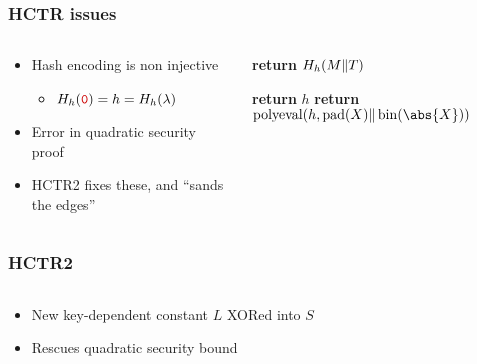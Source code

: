 \documentclass[aspectratio=169]{beamer}
\newenvironment*{figslide}{
    \begin{columns}
        \begin{column}{.4\textwidth}

}{
\end{column}
\begin{column}{.6\textwidth}
    \begin{figure}
        
    \end{figure}
\end{column}
\end{columns}
}
\begin{document}
\begin{frame}

\frametitle{HCTR issues}
\begin{columns}
    \begin{column}{.4\textwidth}
        \begin{itemize}
            \item Hash encoding is non injective
            \begin{itemize}
                \item \(H_h(\bino) = h = H_h(\lambda)\)
            \end{itemize}
            \item Error in quadratic security proof
            \item HCTR2 fixes these, and ``sands the edges''
        \end{itemize}
    \end{column}
    \begin{column}{.6\textwidth}
        \begin{algorithmic}
                \State \textbf{return} \(H_h(M \Vert T)\)
            \EndProcedure
        \end{algorithmic}
        \begin{algorithmic}
                \State \textbf{return} \(h\)
            \Else
                \State \textbf{return} \(\operatorname{polyeval}(h, \pad(X)\Concat\fromint(\abs{X}))\)
            \EndIf
            \EndProcedure
        \end{algorithmic}
\end{column}
\end{columns}

\end{frame}

\togglefalse{oldhctr}

\begin{frame}

\frametitle{HCTR2}
\begin{figslide}
    \begin{itemize}
        \item New key-dependent constant \(L\) XORed into \(S\)
        \item Rescues quadratic security bound
    \end{itemize}
\end{figslide}

\end{frame}
\end{document}
